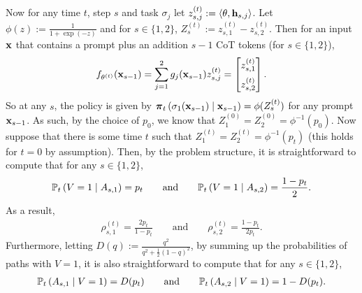 \documentclass{article}
\theoremstyle{plain}
\theoremstyle{definition}
\theoremstyle{remark}
\begin{document}
Now for any time $t$, step $s$ and task $\sigma_j$ let $z^{(t)}_{s,j} := \langle \theta, \bh_{s,j} \rangle$. Let $\phi(z):=\frac{1}{1+\exp(-z)}$ and for $s\in\{1,2\}$, $Z^{(t)}_s:=z_{s, 1}^{(t)} - z_{s, 2}^{(t)}$. Then for an input $\bx$ that contains a prompt plus an addition $s-1$ CoT tokens (for $s\in \{1,2\}$),
\begin{align}\label{eq: log_example}
    f_{\theta^{(t)}}(\bx_{s-1}) = \sum_{j=1}^2 g_j(\bx_{s-1}) z^{(t)}_{s, j} = 
    \begin{bmatrix}
        z^{(t)}_{s, 1} \\[6pt]
        z^{(t)}_{s, 2}
    \end{bmatrix}.
\end{align}
So at any $s$, the policy is given by $\bpi_t\left(\sigma_1(\bx_{s-1}) \mid \bx_{s-1}\right) = \phi(Z^{(t)}_s)$ for any prompt $\bx_{s-1}$. As such, by the choice of $p_0$, we know that $Z_1^{(0)} = Z_2^{(0)} = \phi^{-1}(p_0)$. Now suppose that there is some time $t$ such that $Z_1^{(t)} = Z_2^{(t)} = \phi^{-1}(p_t)$ (this holds for $t=0$ by assumption). Then, by the problem structure, it is straightforward to compute that for any $s\in\{1,2\}$,
\begin{align*}
    \P_t\left(V=1 \mid A_{s,1}\right) = p_t \qquad \text{and} \qquad
    \P_t\left(V=1 \mid A_{s,2}\right) = \frac{1-p_t}{2}.
\end{align*}
As a result, 
\begin{align}\label{eq: rho_example}
    \rho_{s, 1}^{(t)} = \frac{2p_t}{1-p_t} \qquad \text{and} \qquad \rho_{s, 2}^{(t)} = \frac{1-p_t}{2p_t}.
\end{align}
Furthermore, letting $D(q):= \frac{q^2}{q^2 + \frac{1}{2}(1-q)^2}$, by summing up the probabilities of paths with $V=1$, it is also straightforward to compute that for any $s\in\{1,2\}$,
\begin{align}\label{eq: d_example}
    \P_t\left(A_{s,1} \mid V=1\right) = D(p_t) \qquad \text{and} \qquad \P_t\left(A_{s,2} \mid V=1\right) = 1 - D(p_t).
\end{align}
\end{document}

